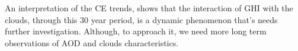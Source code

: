 \documentclass[preprint, 5p,
authoryear]{elsarticle} %
\begin{document}
An interpretation of the CE trends, shows that the interaction of GHI
with the clouds, through this 30 year period, is a dynamic phenomenon
that's needs further investigation. Although, to approach it, we need
more long term observations of AOD and clouds characteristics.


\end{document}
